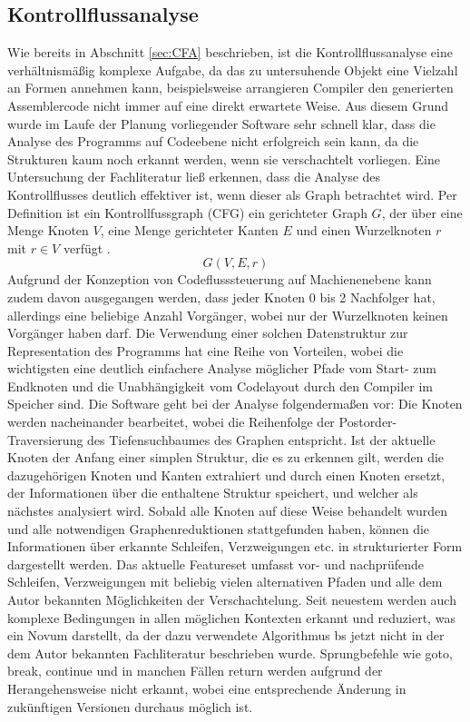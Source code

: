 \documentclass[11pt]{article} %
\begin{document}
\begin{multicols}{2}
\subsection{Kontrollflussanalyse}
Wie bereits in Abschnitt \ref{sec:CFA} beschrieben, ist die Kontrollflussanalyse eine verhältnismäßig komplexe Aufgabe, da das zu untersuhende Objekt eine Vielzahl an Formen annehmen kann, beispielsweise arrangieren Compiler den generierten Assemblercode nicht immer auf eine direkt erwartete Weise. Aus diesem Grund wurde im Laufe der Planung vorliegender Software sehr schnell klar, dass die Analyse des Programms auf Codeebene nicht erfolgreich sein kann, da die Strukturen kaum noch erkannt werden, wenn sie verschachtelt vorliegen. Eine Untersuchung der Fachliteratur ließ erkennen, dass die Analyse des Kontrollflusses deutlich effektiver ist, wenn dieser als Graph betrachtet wird. Per Definition ist ein Kontrollfussgraph (CFG) ein gerichteter Graph \(G\), der über eine Menge Knoten \(V\), eine Menge gerichteter Kanten \(E\) und einen Wurzelknoten \(r\) mit \(r \in V\) verfügt \cite{wiki1:3}. \[G(V,E,r)\] Aufgrund der Konzeption von Codeflusssteuerung auf Machienenebene kann zudem davon ausgegangen werden, dass jeder Knoten 0 bis 2 Nachfolger hat, allerdings eine beliebige Anzahl Vorgänger, wobei nur der Wurzelknoten keinen Vorgänger haben darf. Die Verwendung einer solchen Datenstruktur zur Representation des Programms hat eine Reihe von Vorteilen, wobei die wichtigsten eine deutlich einfachere Analyse möglicher Pfade vom Start- zum Endknoten und die Unabhängigkeit vom Codelayout durch den Compiler im Speicher sind.
Die Software geht bei der Analyse folgendermaßen vor: Die Knoten werden nacheinander bearbeitet, wobei die Reihenfolge der Postorder-Traversierung des Tiefensuchbaumes des Graphen entspricht. Ist der aktuelle Knoten der Anfang einer simplen Struktur, die es zu erkennen gilt, werden die dazugehörigen Knoten und Kanten extrahiert und durch einen Knoten ersetzt, der Informationen über die enthaltene Struktur speichert, und welcher als nächstes analysiert wird. Sobald alle Knoten auf diese Weise behandelt wurden und alle notwendigen Graphenreduktionen stattgefunden haben, können die Informationen über erkannte Schleifen, Verzweigungen etc. in strukturierter Form dargestellt werden. Das aktuelle Featureset umfasst vor- und nachprüfende Schleifen, Verzweigungen mit beliebig vielen alternativen Pfaden und alle dem Autor bekannten Möglichkeiten der Verschachtelung. Seit neuestem werden auch komplexe Bedingungen in allen möglichen Kontexten erkannt und reduziert, was ein Novum darstellt, da der dazu verwendete Algorithmus bs jetzt nicht in der dem Autor bekannten Fachliteratur beschrieben wurde. Sprungbefehle wie goto, break, continue und in manchen Fällen return werden aufgrund der Herangehensweise nicht erkannt, wobei eine entsprechende Änderung in zukünftigen Versionen durchaus möglich ist.


\end{multicols}
\end{document}
